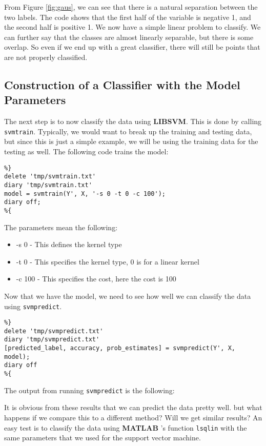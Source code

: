 \documentclass[11pt, twoside]{article}   	%
\begin{document}
From Figure  \ref{fig:gaus}, we can see that there is a natural separation between the two labels. 
The code shows that the first half of the  variable is negative 1, and the second half is positive 1. 
We now have a simple linear problem to classify. We can further say that the classes are almost
linearly separable, but there is some overlap. So even if we end up with a great classifier, there
will still be points that are not properly classified. 


\subsection{Construction of a Classifier with the Model Parameters}
The next step is to now classify the data using \textbf{LIBSVM}. This is done by calling \texttt{svmtrain}.
 Typically, we would want to break up the training and testing data, but since 
this is just a simple example, we will be using the training data for the testing as well. The following code 
trains the model: 
\begin{lstlisting}
%}
delete 'tmp/svmtrain.txt'
diary 'tmp/svmtrain.txt'
model = svmtrain(Y', X, '-s 0 -t 0 -c 100');
diary off; 
%{
\end{lstlisting}

\color{lightgray}


\color{black}

The parameters mean the following: 
\begin{itemize}
\item -s 0 - This defines the kernel type
\item -t 0 - This specifies the kernel type, 0 is for a linear kernel
\item -c 100 - This specifies the cost, here the cost is 100
\end{itemize}

Now that we have the model, we need to see how well we can classify
the data using \texttt{svmpredict}. 
\begin{lstlisting}
%}
delete 'tmp/svmpredict.txt'
diary 'tmp/svmpredict.txt'
[predicted_label, accuracy, prob_estimates] = svmpredict(Y', X, model); 
diary off
%{
\end{lstlisting}

The output from running \texttt{svmpredict} is the following: 
\color{lightgray}
\color{black}

It is obvious from these results that we can predict the data pretty well. 
but what happens if we compare this to a different method? Will we get
similar results? An easy test is to classify the data using \textbf{MATLAB}
's function \texttt{lsqlin} with the same parameters that we used 
for the support vector machine. 
\end{document}

